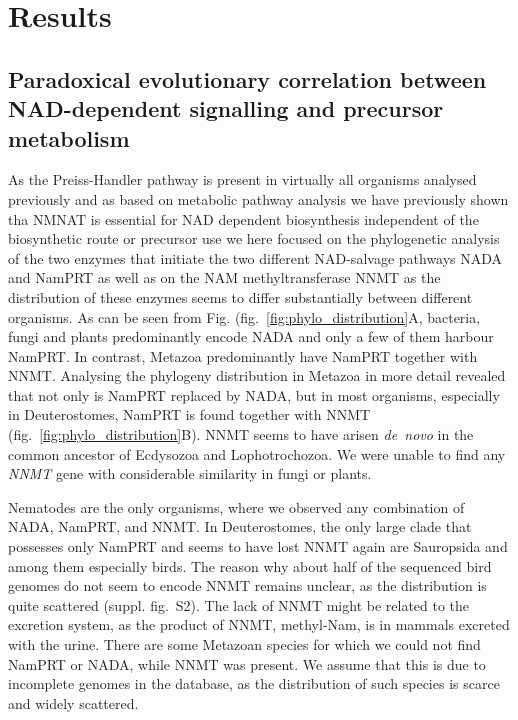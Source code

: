 
\section{Results}

\subsection{Paradoxical evolutionary correlation between NAD-dependent signalling and precursor metabolism}
As the Preiss-Handler pathway  is  present in virtually all organisms analysed previously\cite{Gossmann2012FEBS} and as based on metabolic pathway analysis we have previously shown tha NMNAT is essential for NAD dependent biosynthesis independent of the biosynthetic route or precursor use \cite{Gossmann2011} we here focused on the phylogenetic analysis of the two enzymes that initiate the two different NAD-salvage pathways NADA and NamPRT as well as on the NAM methyltransferase NNMT as the distribution of these enzymes seems to differ substantially between different organisms. As can be seen from Fig. (fig.~\ref{fig:phylo_distribution}A, bacteria, fungi and plants predominantly encode NADA and only a few of them harbour NamPRT.  In contrast, Metazoa predominantly have NamPRT together with NNMT. Analysing the phylogeny distribution in Metazoa in more detail revealed that not only is NamPRT replaced by NADA, but in most organisms, especially in Deuterostomes, NamPRT is found together with NNMT (fig.~\ref{fig:phylo_distribution}B). NNMT seems to have arisen \textit{de~novo} in the common ancestor of Ecdysozoa and Lophotrochozoa. We were unable to find any \textit{NNMT} gene with considerable  similarity in fungi or plants. 

Nematodes are the only organisms, where we observed any combination of NADA, NamPRT, and NNMT. In Deuterostomes, the only large clade that possesses only NamPRT and seems to have lost NNMT again are Sauropsida and among them especially birds. The reason why about half of the sequenced bird genomes do not seem to encode NNMT remains unclear, as the distribution is quite scattered (suppl. fig.~S2). The lack of NNMT might be related to the excretion system, as the product of NNMT, methyl-Nam, is in mammals excreted with the urine. There are some Metazoan species for which we could not find NamPRT or NADA, while NNMT was present. We assume that this is due to incomplete genomes in the database, as the distribution of such species is scarce and widely scattered.

